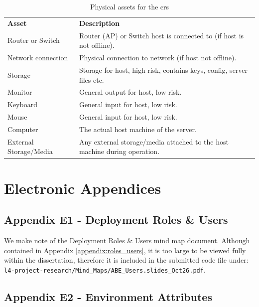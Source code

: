 \begin{appendices}
\begin{table}[htp]
  \begin{tabularx}{\linewidth}{lX}
    \textbf{Asset}          & \textbf{Description} \\
    Router or Switch        &	Router (AP) or Switch host is connected to (if host is not offline). \\
    Network connection      &	Physical connection to network (if host not offline). \\
    Storage                 &	Storage for host, high risk, contains keys, config, server files etc. \\
    Monitor                 &	General output for host, low risk. \\
    Keyboard                &	General input for host, low risk. \\
    Mouse                   &	General input for host, low risk. \\
    Computer                &	The actual host machine of the server. \\
    External Storage/Media  &	Any external storage/media attached to the host machine during operation. \\
  \end{tabularx}
  \caption{Physical assets for the \acrfull{crs}}
  \label{tab:physical_assets_cr}
\end{table}

\clearpage

\section{Electronic Appendices}
\label{appendix:electronic_appendices}

\subsection{Appendix E1 - Deployment Roles \& Users}
\label{appendix:e_roles_users}

We make note of the Deployment Roles \& Users mind map document. Although contained in Appendix \ref{appendix:roles_users}, it is too large to be viewed fully within the dissertation, therefore it is included in the submitted code file under: \texttt{l4-project-research/Mind\_Maps/ABE\_Users.slides\_Oct26.pdf}.

\subsection{Appendix E2 - Environment Attributes}
\label{appendix:e_environments}


\end{appendices}
